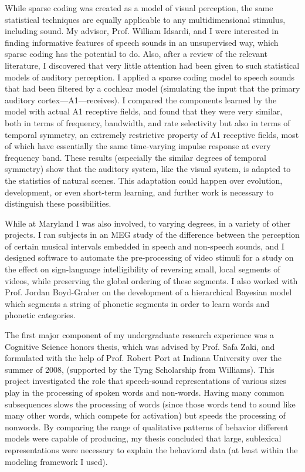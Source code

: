 \documentclass[12pt]{article}
\begin{document}
While sparse coding was created as a model of visual perception, the same statistical techniques are equally applicable to any multidimensional stimulus, including sound.  My advisor, Prof. William Idsardi, and I were interested in finding informative features of speech sounds in an unsupervised way, which sparse coding has the potential to do.  Also, after a review of the relevant literature, I discovered that very little attention had been given to such statistical models of auditory perception.  I applied a sparse coding model to speech sounds that had been filtered by a cochlear model (simulating the input that the primary auditory cortex---A1---receives).  I compared the components learned by the model with actual A1 receptive fields, and found that they were very similar, both in terms of frequency, bandwidth, and rate selectivity but also in terms of temporal symmetry, an extremely restrictive property of A1 receptive fields, most of which have essentially the same time-varying impulse response at every frequency band.  These results (especially the similar degrees of temporal symmetry) show that the auditory system, like the visual system, is adapted to the statistics of natural scenes.  This adaptation could happen over evolution, development, or even short-term learning, and further work is necessary to distinguish these possibilities.

While at Maryland I was also involved, to varying degrees, in a variety of other projects.  I ran subjects in an MEG study of the difference between the perception of certain musical intervals embedded in speech and non-speech sounds, and I designed software to automate the pre-processing of video stimuli for a study on the effect on sign-language intelligibility of reversing small, local segments of videos, while preserving the global ordering of these segments.  I also worked with Prof. Jordan Boyd-Graber on the development of a hierarchical Bayesian model which segments a string of phonetic segments in order to learn words and phonetic categories.

The first major component of my undergraduate research experience was a Cognitive Science honors thesis, which was advised by Prof. Safa Zaki, and formulated with the help of Prof. Robert Port at Indiana University over the summer of 2008, (supported by the Tyng Scholarship from Williams).  This project investigated the role that speech-sound representations of various sizes play in the processing of spoken words and non-words.  Having many common subsequences slows the processing of words (since those words tend to sound like many other words, which compete for activation) but speeds the processing of nonwords.  By comparing the range of qualitative patterns of behavior different models were capable of producing, my thesis concluded that large, sublexical representations were necessary to explain the behavioral data (at least within the modeling framework I used).
\end{document}
